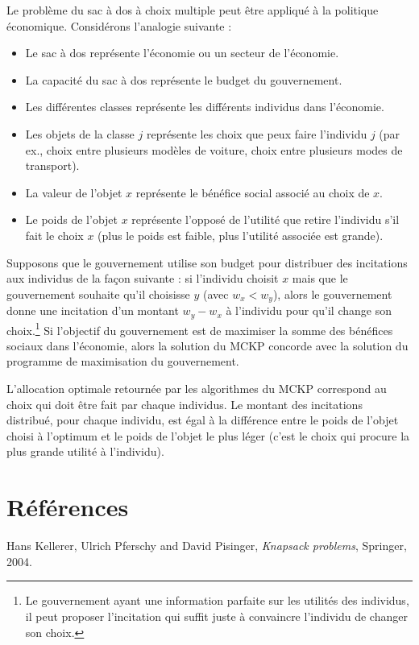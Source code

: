 \documentclass{article}
\begin{document}
Le problème du sac à dos à choix multiple peut être appliqué à la politique économique.
Considérons l'analogie suivante :
\begin{itemize}
	\item Le sac à dos représente l'économie ou un secteur de l'économie.
	\item La capacité du sac à dos représente le budget du gouvernement.
	\item Les différentes classes représente les différents individus dans l'économie.
	\item Les objets de la classe $j$ représente les choix que peux faire l'individu $j$ (par ex., choix entre plusieurs modèles de voiture, choix entre plusieurs modes de transport).
	\item La valeur de l'objet $x$ représente le bénéfice social associé au choix de $x$.
	\item Le poids de l'objet $x$ représente l'opposé de l'utilité que retire l'individu s'il fait le choix $x$ (plus le poids est faible, plus l'utilité associée est grande).
\end{itemize}

Supposons que le gouvernement utilise son budget pour distribuer des incitations aux individus de la façon suivante : si l'individu choisit $x$ mais que le gouvernement souhaite qu'il choisisse $y$ (avec $w_x < w_y$), alors le gouvernement donne une incitation d'un montant $w_y - w_x$ à l'individu pour qu'il change son choix.\footnote{Le gouvernement ayant une information parfaite sur les utilités des individus, il peut proposer l'incitation qui suffit juste à convaincre l'individu de changer son choix.}
Si l'objectif du gouvernement est de maximiser la somme des bénéfices sociaux dans l'économie, alors la solution du MCKP concorde avec la solution du programme de maximisation du gouvernement.

L'allocation optimale retournée par les algorithmes du MCKP correspond au choix qui doit être fait par chaque individus.
Le montant des incitations distribué, pour chaque individu, est égal à la différence entre le poids de l'objet choisi à l'optimum et le poids de l'objet le plus léger (c'est le choix qui procure la plus grande utilité à l'individu).

\section{Références}

\begin{thebibliography}{9}
  Hans Kellerer, Ulrich Pferschy and David Pisinger,
  \textit{Knapsack problems},
  Springer,
  2004.
\end{thebibliography}
\end{document}
